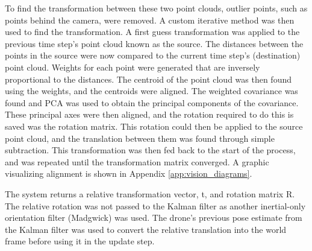 \documentclass[bare_jrnl_transmag]{subfiles}
\begin{document}
To find the transformation between these two point clouds, outlier points, such as points behind the camera, were removed. A custom iterative method was then used to find the transformation. A first guess transformation was applied to the previous time step's point cloud known as the source. The distances between the points in the source were now compared to the current time step's (destination) point cloud. Weights for each point were generated that are inversely proportional to the distances. The centroid of the point cloud was then found using the weights, and the centroids were aligned. The weighted covariance was found and PCA was used to obtain the principal components of the covariance. These principal axes were then aligned, and the rotation required to do this is saved was the rotation matrix. This rotation could then be applied to the source point cloud, and the translation between them was found through simple subtraction. This transformation was then fed back to the start of the process, and was repeated until the transformation matrix converged. A graphic visualizing alignment is shown in Appendix \ref{app:vision_diagrams}. \newline

The system returns a relative transformation vector, t, and rotation matrix R. The relative rotation was not passed to the Kalman filter as another inertial-only orientation filter (Madgwick) was used. The drone's previous pose estimate from the Kalman filter was used to convert the relative translation into the world frame before using it in the update step.
\end{document}
